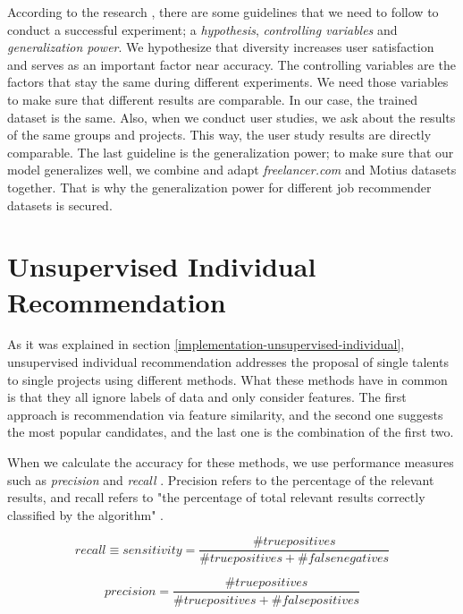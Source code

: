 According to the research \cite{shani2011evaluating}, there are some guidelines that we need to follow to conduct a successful experiment; a \textit{hypothesis}, \textit{controlling variables} and \textit{generalization power}. We hypothesize that diversity increases user satisfaction and serves as an important factor near accuracy. The controlling variables are the factors that stay the same during different experiments. We need those variables to make sure that different results are comparable. In our case, the trained dataset is the same. Also, when we conduct user studies, we ask about the results of the same groups and projects. This way, the user study results are directly comparable. The last guideline is the generalization power; to make sure that our model generalizes well, we combine and adapt \textit{freelancer.com} and Motius datasets together. That is why the generalization power for different job recommender datasets is secured. 


\section{Unsupervised Individual Recommendation}

As it was explained in section \ref{implementation-unsupervised-individual}, unsupervised individual recommendation addresses the proposal of single talents to single projects using different methods. What these methods have in common is that they all ignore labels of data and only consider features. The first approach is recommendation via feature similarity, and the second one suggests the most popular candidates, and the last one is the combination of the first two.

When we calculate the accuracy for these methods, we use performance measures such as \textit{precision} and \textit{recall} \cite{burke2015robust}. Precision refers to the percentage of the relevant results, and recall refers to "the percentage of total relevant results correctly classified by the algorithm" \cite{davis2006relationship}.

\begin{equation}
recall \equiv  sensitivity =\frac{\#  true positives }{\# true positives +\# false negatives }
\end{equation}

\begin{equation}
precision =\frac{\#true positives }{\# true positives +\#  false positives }
\end{equation}

